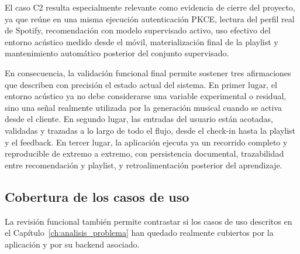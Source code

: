El caso C2 resulta especialmente relevante como evidencia de cierre del
proyecto, ya que reúne en una misma ejecución autenticación PKCE, lectura del
perfil real de Spotify, recomendación con modelo supervisado activo, uso
efectivo del entorno acústico medido desde el móvil, materialización final de
la playlist y mantenimiento automático posterior del conjunto supervisado.

En consecuencia, la validación funcional final permite sostener tres
afirmaciones que describen con precisión el estado actual del sistema. En
primer lugar, el entorno acústico ya no debe considerarse una variable
experimental o residual, sino una señal realmente utilizada por la generación
musical cuando se activa desde el cliente. En segundo lugar, las entradas del
usuario están acotadas, validadas y trazadas a lo largo de todo el flujo, desde
el check-in hasta la playlist y el feedback. En tercer lugar, la aplicación
ejecuta ya un recorrido completo y reproducible de extremo a extremo, con
persistencia documental, trazabilidad entre recomendación y playlist, y
retroalimentación posterior del aprendizaje.

\subsection*{Cobertura de los casos de uso}

La revisión funcional también permite contrastar si los casos de uso descritos
en el Capítulo~\ref{ch:analisis_problema} han quedado realmente cubiertos por
la aplicación y por su backend asociado.

